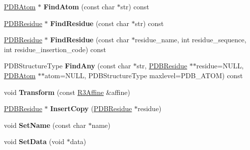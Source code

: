 \begin{DoxyCompactItemize}
\item 
\hyperlink{class_p_d_b_atom}{P\+D\+B\+Atom} $\ast$ {\bfseries Find\+Atom} (const char $\ast$str) const \hypertarget{class_p_d_b_chain_a8e333724de5631c2c9eeb755e14fdfde}{}\label{class_p_d_b_chain_a8e333724de5631c2c9eeb755e14fdfde}

\item 
\hyperlink{class_p_d_b_residue}{P\+D\+B\+Residue} $\ast$ {\bfseries Find\+Residue} (const char $\ast$str) const \hypertarget{class_p_d_b_chain_ab85260c5282adc84b74deb977e225095}{}\label{class_p_d_b_chain_ab85260c5282adc84b74deb977e225095}

\item 
\hyperlink{class_p_d_b_residue}{P\+D\+B\+Residue} $\ast$ {\bfseries Find\+Residue} (const char $\ast$residue\+\_\+name, int residue\+\_\+sequence, int residue\+\_\+insertion\+\_\+code) const \hypertarget{class_p_d_b_chain_a2318dbc9c6761968b1bdb08f1501a002}{}\label{class_p_d_b_chain_a2318dbc9c6761968b1bdb08f1501a002}

\item 
P\+D\+B\+Structure\+Type {\bfseries Find\+Any} (const char $\ast$str, \hyperlink{class_p_d_b_residue}{P\+D\+B\+Residue} $\ast$$\ast$residue=N\+U\+LL, \hyperlink{class_p_d_b_atom}{P\+D\+B\+Atom} $\ast$$\ast$atom=N\+U\+LL, P\+D\+B\+Structure\+Type maxlevel=P\+D\+B\+\_\+\+A\+T\+OM) const \hypertarget{class_p_d_b_chain_ad078cecd8b3e3929175bf55f78c92f81}{}\label{class_p_d_b_chain_ad078cecd8b3e3929175bf55f78c92f81}

\item 
void {\bfseries Transform} (const \hyperlink{class_r3_affine}{R3\+Affine} \&affine)\hypertarget{class_p_d_b_chain_a474f96cbe3007819b61af7cde8803fdc}{}\label{class_p_d_b_chain_a474f96cbe3007819b61af7cde8803fdc}

\item 
\hyperlink{class_p_d_b_residue}{P\+D\+B\+Residue} $\ast$ {\bfseries Insert\+Copy} (\hyperlink{class_p_d_b_residue}{P\+D\+B\+Residue} $\ast$residue)\hypertarget{class_p_d_b_chain_ad445ef23366f9ea563640f0ecc36ccff}{}\label{class_p_d_b_chain_ad445ef23366f9ea563640f0ecc36ccff}

\item 
void {\bfseries Set\+Name} (const char $\ast$name)\hypertarget{class_p_d_b_chain_afcd01121c12547eb19a0f48704a18f74}{}\label{class_p_d_b_chain_afcd01121c12547eb19a0f48704a18f74}

\item 
void {\bfseries Set\+Data} (void $\ast$data)\hypertarget{class_p_d_b_chain_aabc3dfcfa1190a400851a6db00d164b5}{}\label{class_p_d_b_chain_aabc3dfcfa1190a400851a6db00d164b5}


\end{DoxyCompactItemize}
